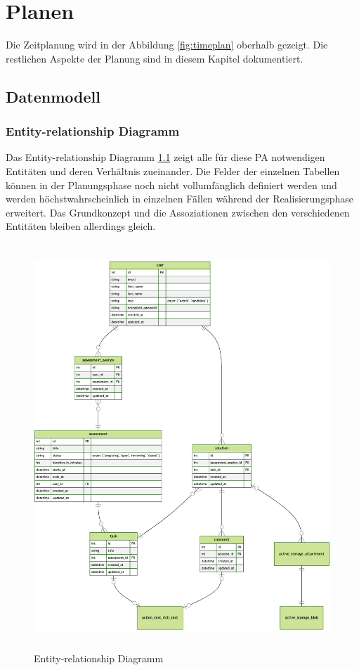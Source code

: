 \chapter{Planen} \label{ch:plan}

Die Zeitplanung wird in der Abbildung \ref{fig:timeplan} oberhalb gezeigt. Die restlichen Aspekte der Planung sind in diesem Kapitel dokumentiert.

\section{Datenmodell}

\subsection{Entity-relationship Diagramm}

Das Entity-relationship Diagramm \ref{fig:erd} zeigt alle für diese PA notwendigen Entitäten und deren Verhältnis zueinander. Die Felder
der einzelnen Tabellen können in der Planungsphase noch nicht vollumfänglich definiert werden und werden höchstwahrscheinlich in einzelnen Fällen während der Realisierungsphase
erweitert. Das Grundkonzept und die Assoziationen zwischen den verschiedenen Entitäten bleiben allerdings gleich.

\begin{figure}[H]
    \centering
    \includegraphics[height=15.25cm]{images/diagrams/entity-relation.png}
    \caption{\label{fig:erd}Entity-relationship Diagramm}
\end{figure}

